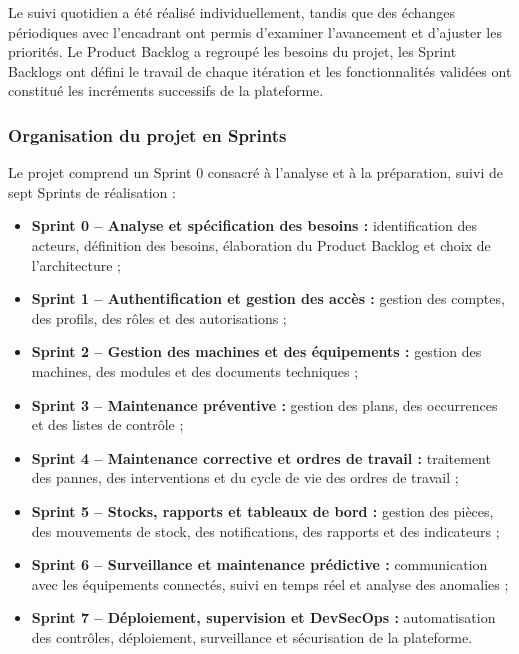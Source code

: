 Le suivi quotidien a été réalisé individuellement, tandis que des échanges périodiques avec l’encadrant ont permis d’examiner l’avancement et d’ajuster les priorités. Le Product Backlog a regroupé les besoins du projet, les Sprint Backlogs ont défini le travail de chaque itération et les fonctionnalités validées ont constitué les incréments successifs de la plateforme.

\subsubsection{Organisation du projet en Sprints}

Le projet comprend un Sprint 0 consacré à l’analyse et à la préparation, suivi de sept Sprints de réalisation :

\begin{itemize}
    \item \textbf{Sprint 0 -- Analyse et spécification des besoins :} identification des acteurs, définition des besoins, élaboration du Product Backlog et choix de l’architecture ;

    \item \textbf{Sprint 1 -- Authentification et gestion des accès :} gestion des comptes, des profils, des rôles et des autorisations ;

    \item \textbf{Sprint 2 -- Gestion des machines et des équipements :} gestion des machines, des modules et des documents techniques ;

    \item \textbf{Sprint 3 -- Maintenance préventive :} gestion des plans, des occurrences et des listes de contrôle ;

    \item \textbf{Sprint 4 -- Maintenance corrective et ordres de travail :} traitement des pannes, des interventions et du cycle de vie des ordres de travail ;

    \item \textbf{Sprint 5 -- Stocks, rapports et tableaux de bord :} gestion des pièces, des mouvements de stock, des notifications, des rapports et des indicateurs ;

    \item \textbf{Sprint 6 -- Surveillance et maintenance prédictive :} communication avec les équipements connectés, suivi en temps réel et analyse des anomalies ;

    \item \textbf{Sprint 7 -- Déploiement, supervision et DevSecOps :} automatisation des contrôles, déploiement, surveillance et sécurisation de la plateforme.
\end{itemize}

